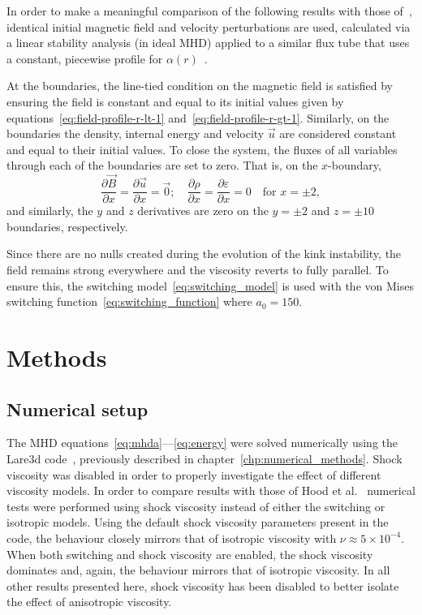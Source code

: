 In order to make a meaningful comparison of the following results with those of~\cite{hoodCoronalHeatingMagnetic2009}, identical initial magnetic field and velocity perturbations are used, calculated via a linear stability analysis (in ideal MHD) applied to a similar flux tube that uses a constant, piecewise profile for $\alpha(r)$~\cite{vanderlindenCompleteCoronalLoop1999,browningSolarCoronalHeating2003c,browningHeatingCoronaNanoflares2008a}.

At the boundaries, the line-tied condition on the magnetic field is satisfied by ensuring the field is constant and equal to its initial values given by equations~\eqref{eq:field-profile-r-lt-1} and~\eqref{eq:field-profile-r-gt-1}. Similarly, on the boundaries the density, internal energy and velocity $\vec{u}$ are considered constant and equal to their initial values. To close the system, the fluxes of all variables through each of the boundaries are set to zero. That is, on the $x$-boundary,
\begin{equation}
  \frac{\partial \vec{B}}{\partial x} = \frac{\partial \vec{u}}{\partial x} = \vec{0}; \quad \frac{\partial \rho}{\partial x} = \frac{\partial \varepsilon}{\partial x} = 0 \quad \text{for } x=\pm 2,
\end{equation}
and similarly, the $y$ and $z$ derivatives are zero on the $y=\pm2$ and $z=\pm10$ boundaries, respectively.

Since there are no nulls created during the evolution of the kink instability, the field remains strong everywhere and the viscosity reverts to fully parallel. To ensure this, the switching model~\eqref{eq:switching_model} is used with the von Mises switching function~\eqref{eq:switching_function} where $a_0 = 150$. 

\section{Methods}
\label{sec:general-numerical-setup}

\subsection{Numerical setup}

The MHD equations~\eqref{eq:mhda}---\eqref{eq:energy} were solved numerically using the Lare3d code~\cite{arberStaggeredGridLagrangian2001}, previously described in chapter~\ref{chp:numerical_methods}. Shock viscosity was disabled in order to properly investigate the effect of different viscosity models. In order to compare results with those of Hood et al.~\cite{hoodCoronalHeatingMagnetic2009} numerical tests were performed using shock viscosity instead of either the switching or isotropic models. Using the default shock viscosity parameters present in the code, the behaviour closely mirrors that of isotropic viscosity with $\nu\approx 5\times10^{-4}$. When both switching and shock viscosity are enabled, the shock viscosity dominates and, again, the behaviour mirrors that of isotropic viscosity. In all other results presented here, shock viscosity has been disabled to better isolate the effect of anisotropic viscosity.

